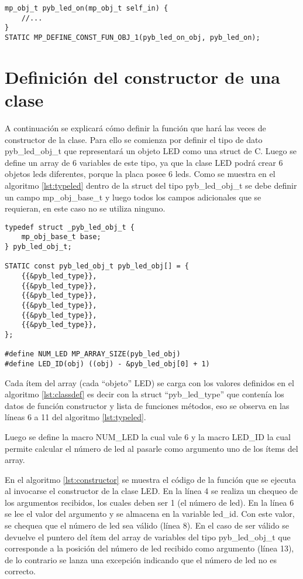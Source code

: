 \begin{lstlisting}[label={lst:ledon},caption=Función que se ejecuta al invocar el método on().] 
mp_obj_t pyb_led_on(mp_obj_t self_in) {
    //...
}
STATIC MP_DEFINE_CONST_FUN_OBJ_1(pyb_led_on_obj, pyb_led_on);
\end{lstlisting}

\section{Definición del constructor de una clase}

A continuación se explicará cómo definir la función que hará las veces de constructor de la clase. Para ello se comienza por definir el tipo de dato pyb\_led\_obj\_t que representará un objeto LED como una struct de C.
Luego se define un array de 6 variables de este tipo, ya que la clase LED podrá crear 6 objetos leds diferentes, porque la placa posee 6 leds. Como se muestra en el algoritmo \ref{lst:typeled} dentro de la struct del tipo pyb\_led\_obj\_t se debe definir un campo mp\_obj\_base\_t y luego todos los campos adicionales que se requieran, en este caso no se utiliza ninguno.

\begin{lstlisting}[label={lst:typeled},caption=Definición de un array de objetos LED para C.] 
typedef struct _pyb_led_obj_t {
    mp_obj_base_t base;
} pyb_led_obj_t;

STATIC const pyb_led_obj_t pyb_led_obj[] = {
    {{&pyb_led_type}},
    {{&pyb_led_type}},
    {{&pyb_led_type}},
    {{&pyb_led_type}},
    {{&pyb_led_type}},
    {{&pyb_led_type}},
};

#define NUM_LED MP_ARRAY_SIZE(pyb_led_obj)
#define LED_ID(obj) ((obj) - &pyb_led_obj[0] + 1)
\end{lstlisting}

Cada ítem del array (cada “objeto” LED) se carga con los valores definidos en el algoritmo \ref{lst:classdef} es decir con la struct “pyb\_led\_type”  que contenía los datos de función constructor y lista de funciones métodos, eso se observa en las líneas 6 a 11 del algoritmo \ref{lst:typeled}.

Luego se define la macro NUM\_LED la cual vale 6 y la macro LED\_ID la cual permite calcular el número de led al pasarle como argumento uno de los ítems del array.

En el algoritmo \ref{lst:constructor} se muestra el código de la función que se ejecuta al invocarse el constructor de la clase LED. En la línea 4 se realiza un chequeo de los argumentos recibidos, los cuales deben ser 1 (el número de led). En la línea 6 se lee el valor del argumento y se almacena en la variable led\_id. Con este valor, se chequea que el número de led sea válido (línea 8). En el caso de ser válido se devuelve el puntero del ítem del array de variables del tipo pyb\_led\_obj\_t que corresponde a la posición del número de led recibido como argumento (línea 13), de lo contrario se lanza una excepción indicando que el número de led no es correcto.

